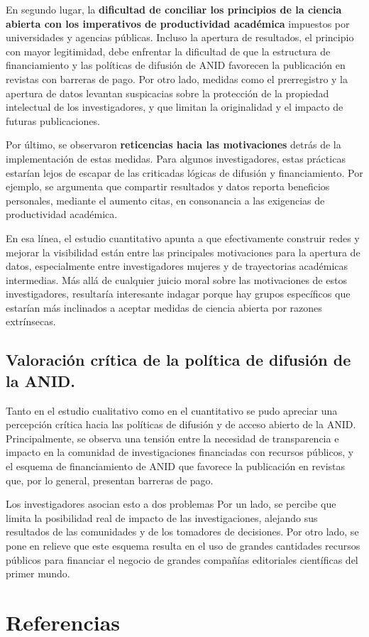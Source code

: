 \documentclass[
  letterpaper,
  DIV=11,
  numbers=noendperiod]{scrreprt}
\newlength{\cslhangindent}
\newenvironment{CSLReferences}[2] %
 {\begin{list}{}{%
  \setlength{\itemindent}{0pt}
  \setlength{\leftmargin}{0pt}
  \setlength{\parsep}{0pt}
  \ifodd #1
   \setlength{\leftmargin}{\cslhangindent}
   \setlength{\itemindent}{-1\cslhangindent}
  \fi
  \setlength{\itemsep}{#2\baselineskip}}}
 {\end{list}}
\begin{document}
En segundo lugar, la \textbf{dificultad de conciliar los principios de
la ciencia abierta con los imperativos de productividad académica}
impuestos por universidades y agencias públicas. Incluso la apertura de
resultados, el principio con mayor legitimidad, debe enfrentar la
dificultad de que la estructura de financiamiento y las políticas de
difusión de ANID favorecen la publicación en revistas con barreras de
pago. Por otro lado, medidas como el prerregistro y la apertura de datos
levantan suspicacias sobre la protección de la propiedad intelectual de
los investigadores, y que limitan la originalidad y el impacto de
futuras publicaciones.

Por último, se observaron \textbf{reticencias hacia las motivaciones}
detrás de la implementación de estas medidas. Para algunos
investigadores, estas prácticas estarían lejos de escapar de las
criticadas lógicas de difusión y financiamiento. Por ejemplo, se
argumenta que compartir resultados y datos reporta beneficios
personales, mediante el aumento citas, en consonancia a las exigencias
de productividad académica.

En esa línea, el estudio cuantitativo apunta a que efectivamente
construir redes y mejorar la visibilidad están entre las principales
motivaciones para la apertura de datos, especialmente entre
investigadores mujeres y de trayectorias académicas intermedias. Más
allá de cualquier juicio moral sobre las motivaciones de estos
investigadores, resultaría interesante indagar porque hay grupos
específicos que estarían más inclinados a aceptar medidas de ciencia
abierta por razones extrínsecas.

\section{Valoración crítica de la política de difusión de la
ANID.}\label{valoraciuxf3n-cruxedtica-de-la-poluxedtica-de-difusiuxf3n-de-la-anid.}

Tanto en el estudio cualitativo como en el cuantitativo se pudo apreciar
una percepción crítica hacia las políticas de difusión y de acceso
abierto de la ANID. Principalmente, se observa una tensión entre la
necesidad de transparencia e impacto en la comunidad de investigaciones
financiadas con recursos públicos, y el esquema de financiamiento de
ANID que favorece la publicación en revistas que, por lo general,
presentan barreras de pago.

Los investigadores asocian esto a dos problemas Por un lado, se percibe
que limita la posibilidad real de impacto de las investigaciones,
alejando sus resultados de las comunidades y de los tomadores de
decisiones. Por otro lado, se pone en relieve que este esquema resulta
en el uso de grandes cantidades recursos públicos para financiar el
negocio de grandes compañías editoriales científicas del primer mundo.


\chapter*{Referencias}\label{referencias}


\label{refs}
\begin{CSLReferences}{0}{1}
\end{CSLReferences}
\end{document}
